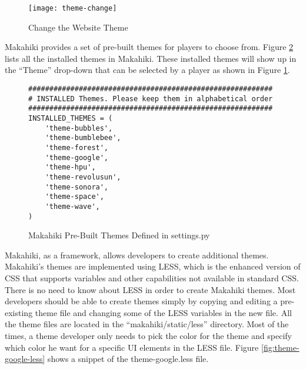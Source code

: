 \begin{figure}[!ht]
  \center
  \texttt{[image: theme-change]}
  \caption{Change the Website Theme}
  \label{fig:theme-change}
\end{figure}

Makahiki provides a set of pre-built themes for players to choose from. Figure \ref{fig:theme-installed} lists all the installed themes in Makahiki. These installed themes will show up in the ``Theme'' drop-down that can be selected by a player as shown in Figure \ref{fig:theme-change}.

\begin{figure}[!ht]
\begin{lstlisting}
##########################################################
# INSTALLED Themes. Please keep them in alphabetical order
##########################################################
INSTALLED_THEMES = (
    'theme-bubbles',
    'theme-bumblebee',
    'theme-forest',
    'theme-google',
    'theme-hpu',
    'theme-revolusun',
    'theme-sonora',
    'theme-space',
    'theme-wave',
)
\end{lstlisting}
\caption{Makahiki Pre-Built Themes Defined in settings.py}
\label{fig:theme-installed}
\end{figure}

Makahiki, as a framework, allows developers to create additional themes. Makahiki's themes are implemented using LESS, which is the  enhanced version of CSS that supports variables and other capabilities not available in standard CSS. There is no need to know about LESS in order to create Makahiki themes. Most developers should be able to create themes simply by copying and editing a pre-existing theme file and changing some of the LESS variables in the new file. All the theme files are located in the ``makahiki/static/less'' directory.  Most of the times, a theme developer only needs to pick the color for the theme and specify which color he want for a specific UI elements in the LESS file. Figure \ref{fig:theme-google-less} shows a snippet of the theme-google.less file.

